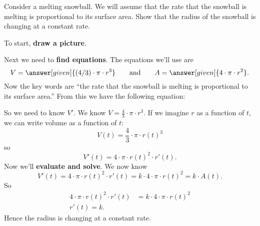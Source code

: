 \documentclass{ximera}
\begin{document}
\begin{example}
  Consider a melting snowball. We will assume that the rate that the
  snowball is melting is proportional to its surface area. Show that
  the radius of the snowball is changing at a constant rate.
  
\begin{explanation}
  To start, \textbf{draw a picture}.
  \begin{image}
  \end{image}
  Next we need to \textbf{find equations}. The equations we'll use are
  \[
  V = \answer[given]{(4/3) \cdot \pi \cdot r^3} \qquad\text{and}\qquad A = \answer[given]{4\cdot
  \pi \cdot r^2}.
  \]
  Now the key words are ``the rate that the snowball is melting is
  proportional to its surface area.'' From this we have the following
  equation:
  \begin{image}
  \end{image}
  So we need to know $V'$. We know $V = \frac{4}{3}\cdot \pi\cdot
  r^3$. If we imagine $r$ as a function of $t$, we can write volume as
  a function of $t$:
  \[
  V(t) = \frac{4}{3}\cdot \pi\cdot r(t)^3
  \]
  so
  \[
  V'(t) = 4\cdot \pi\cdot r(t)^2 \cdot r'(t).
  \]
  Now we'll \textbf{evaluate and solve}. We now know
  \[
  V'(t) = 4\cdot \pi \cdot r(t)^2 \cdot r'(t) =  k\cdot 4\cdot
  \pi \cdot r(t)^2 = k\cdot A(t).
  \]
  So
  \begin{align*}
  4\cdot \pi \cdot r(t)^2 \cdot r'(t) &=  k\cdot 4\cdot
  \pi \cdot r(t)^2\\
  r'(t) = k.
  \end{align*}
  Hence the radius is changing at a constant rate. 
\end{explanation}
\end{example}
\end{document}
